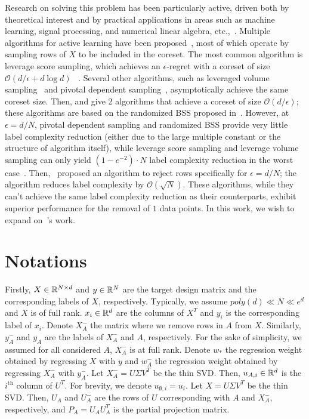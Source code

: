 Research on solving this problem has been particularly active, driven both by theoretical interest and by practical applications in areas such as machine learning, signal processing, and numerical linear algebra, etc.,~\cite{Chkifa2015, Cohn1994, Guo2020, Ksenia2015,Tong2004}. Multiple algorithms for active learning have been proposed~\cite{Alina2009, Boutsidis2013, Castro2008, pmlr-v99-chen19a, Sanjoy2011, Sanjoy2008, derenski2017,derenski2018, drineas2008, gittens2023, Kremer2014, Sivan2014}, most of which operate by sampling rows of $X$ to be included in the coreset. The most common algorithm is leverage score sampling, which achieves an $\epsilon$-regret with a coreset of size $\mathcal{O}(d/\epsilon + d\log d)$ ~\cite{drineas2008,Mahoney2011,Woodruff2014}. Several other algorithms, such as leveraged volume sampling~\cite{derenski2018} and pivotal dependent sampling~\cite{shimizu2024improved}, asymptotically achieve the same coreset size. Then, \cite{pmlr-v99-chen19a} and \cite{Devvrit2022} give 2 algorithms that achieve a coreset of size $\mathcal{O}(d / \epsilon)$; these algorithms are based on the randomized BSS proposed in~\cite{yintatlee2015}. However, at $\epsilon = d/N$, pivotal dependent sampling and randomized BSS provide very little label complexity reduction (either due to the large multiple constant or the structure of algorithm itself), while leverage score sampling and leverage volume sampling can only yield $(1 - e^{-2}) \cdot N$ label complexity reduction in the worst case~\cite{Khai2026review}. Then,~\cite{gittens2023} proposed an algorithm to reject rows specifically for $\epsilon = d/N$; the algorithm reduces label complexity by $\mathcal{O}(\sqrt{N})$. These algorithms, while they can't achieve the same label complexity reduction as their counterparts, exhibit superior performance for the removal of $1$ data points. In this work, we wish to expand on~\cite{gittens2023}'s work.


\section{Notations} 
Firstly, $X \in \mathbb{R}^{N \times d}$ and $y \in \mathbb{R}^N$ are the target design matrix and the corresponding labels of $X$, respectively. Typically, we assume $poly(d) \ll N \ll e^d$ and $X$ is of full rank. $x_i \in \mathbb{R}^d$ are the columns of $X^T$ and $y_i$ is the corresponding label of $x_i$. 
Denote $X^-_A$ the matrix where we remove rows in $A$ from $X$. Similarly, $y_A^-$ and $y_A$ are the labels of $X_A^-$ and $A$, respectively. For the sake of simplicity, we assumed for all considered $A$, $X^-_A$ is at full rank. 
Denote $w_*$ the regression weight obtained by regressing $X$ with $y$ and $w_A^-$ the regression weight obtained by regressing $X_A^-$ with $y_A^-$.
Let $X_A^- = U \Sigma V^T$ be the thin SVD. Then, $u_{A, i} \in \mathbb{R}^d$ is the $i^\mathrm{th}$ column of $U^T$. For brevity, we denote $u_{\emptyset, i} = u_i$.
Let $X = U \Sigma V^T$ be the thin SVD. Then, $U_A$ and $U_A^-$ are the rows of $U$ corresponding with $A$ and $X_A^-$, respectively, and $P_A = U_A U_A^T$ is the partial projection matrix.



